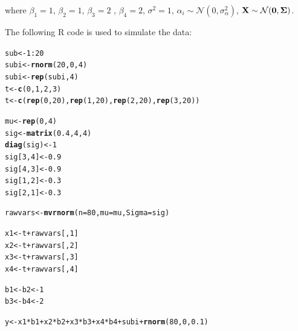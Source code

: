 \documentclass[11pt,a4paper,twoside]{book}\usepackage[]{graphicx}\usepackage[]{color}
\makeatletter
\newcommand{\hlnum}[1]{\textcolor[rgb]{0.686,0.059,0.569}{#1}}%
\newcommand{\hlopt}[1]{\textcolor[rgb]{0,0,0}{#1}}%
\newcommand{\hlstd}[1]{\textcolor[rgb]{0.345,0.345,0.345}{#1}}%
\newcommand{\hlkwb}[1]{\textcolor[rgb]{0.69,0.353,0.396}{#1}}%
\newcommand{\hlkwc}[1]{\textcolor[rgb]{0.333,0.667,0.333}{#1}}%
\newcommand{\hlkwd}[1]{\textcolor[rgb]{0.737,0.353,0.396}{\textbf{#1}}}%
\newenvironment{kframe}{%
 \def\at@end@of@kframe{}%
 \ifinner\ifhmode%
  \def\at@end@of@kframe{\end{minipage}}%
  \begin{minipage}{\columnwidth}%
 \fi\fi%
 \def\FrameCommand##1{\hskip\@totalleftmargin \hskip-\fboxsep
 \colorbox{shadecolor}{##1}\hskip-\fboxsep
     \hskip-\linewidth \hskip-\@totalleftmargin \hskip\columnwidth}%
 \MakeFramed {\advance\hsize-\width
   \@totalleftmargin\z@ \linewidth\hsize
   \@setminipage}}%
 {\par\unskip\endMakeFramed%
 \at@end@of@kframe}
\newenvironment{knitrout}{}{} %
\makeatother
\begin{document}
where $\beta_{1} = 1$, $\beta_{2} = 1$,  $\beta_{3} = 2$ , $\beta_{4}=2$, $\sigma^2 = 1$, $\alpha_{i} \sim \mathcal{N}(0, \sigma_{\alpha}^2)$, ${\mathbf{X}} \sim \mathcal{N}({\mathbf{0}}, {\boldsymbol{\Sigma}}{})$.

The following R code is used to simulate the data:



\begin{knitrout}
\color{fgcolor}\begin{kframe}
\begin{alltt}
\hlstd{sub}\hlkwb{<-} \hlnum{1}\hlopt{:}\hlnum{20}
\hlstd{subi} \hlkwb{<-} \hlkwd{rnorm}\hlstd{(}\hlnum{20}\hlstd{,} \hlnum{0}\hlstd{,} \hlnum{4}\hlstd{)}
\hlstd{subi}\hlkwb{<-}\hlkwd{rep}\hlstd{(subi,} \hlnum{4}\hlstd{)}
\hlstd{t} \hlkwb{<-} \hlkwd{c}\hlstd{(}\hlnum{0}\hlstd{,} \hlnum{1}\hlstd{,} \hlnum{2}\hlstd{,}\hlnum{3}\hlstd{)}
\hlstd{t} \hlkwb{<-} \hlkwd{c}\hlstd{(}\hlkwd{rep}\hlstd{(}\hlnum{0}\hlstd{,} \hlnum{20}\hlstd{),} \hlkwd{rep}\hlstd{(}\hlnum{1}\hlstd{,}\hlnum{20}\hlstd{),} \hlkwd{rep}\hlstd{(}\hlnum{2}\hlstd{,} \hlnum{20}\hlstd{),} \hlkwd{rep}\hlstd{(}\hlnum{3}\hlstd{,}\hlnum{20}\hlstd{))}

\hlstd{mu} \hlkwb{<-} \hlkwd{rep}\hlstd{(}\hlnum{0}\hlstd{,}\hlnum{4}\hlstd{)}
\hlstd{sig} \hlkwb{<-} \hlkwd{matrix}\hlstd{(}\hlnum{0.4}\hlstd{,} \hlnum{4}\hlstd{,} \hlnum{4}\hlstd{)}
\hlkwd{diag}\hlstd{(sig)} \hlkwb{<-} \hlnum{1}
\hlstd{sig[}\hlnum{3}\hlstd{,}\hlnum{4}\hlstd{]} \hlkwb{<-} \hlnum{0.9}
\hlstd{sig[}\hlnum{4}\hlstd{,}\hlnum{3}\hlstd{]} \hlkwb{<-} \hlnum{0.9}
\hlstd{sig[}\hlnum{1}\hlstd{,}\hlnum{2}\hlstd{]} \hlkwb{<-} \hlnum{0.3}
\hlstd{sig[}\hlnum{2}\hlstd{,}\hlnum{1}\hlstd{]} \hlkwb{<-} \hlnum{0.3}


\hlstd{rawvars} \hlkwb{<-} \hlkwd{mvrnorm}\hlstd{(}\hlkwc{n}\hlstd{=}\hlnum{80}\hlstd{,} \hlkwc{mu}\hlstd{=mu,} \hlkwc{Sigma}\hlstd{=sig)}

\hlstd{x1} \hlkwb{<-} \hlstd{t}\hlopt{+}\hlstd{rawvars[,}\hlnum{1}\hlstd{]}
\hlstd{x2} \hlkwb{<-} \hlstd{t}\hlopt{+}\hlstd{rawvars[,}\hlnum{2}\hlstd{]}
\hlstd{x3} \hlkwb{<-} \hlstd{t}\hlopt{+}\hlstd{rawvars[,}\hlnum{3}\hlstd{]}
\hlstd{x4} \hlkwb{<-} \hlstd{t}\hlopt{+}\hlstd{rawvars[,}\hlnum{4}\hlstd{]}

\hlstd{b1} \hlkwb{<-} \hlstd{b2}  \hlkwb{<-}\hlnum{1}
\hlstd{b3} \hlkwb{<-} \hlstd{b4} \hlkwb{<-} \hlnum{2}

\hlstd{y}\hlkwb{<-} \hlstd{x1}\hlopt{*}\hlstd{b1} \hlopt{+}\hlstd{x2}\hlopt{*}\hlstd{b2} \hlopt{+}\hlstd{x3}\hlopt{*}\hlstd{b3}\hlopt{+}  \hlstd{x4}\hlopt{*}\hlstd{b4} \hlopt{+} \hlstd{subi}\hlopt{+} \hlkwd{rnorm}\hlstd{(}\hlnum{80}\hlstd{,} \hlnum{0}\hlstd{,} \hlnum{0.1}\hlstd{)}


\end{alltt}
\end{kframe}
\end{knitrout}
\end{document}
